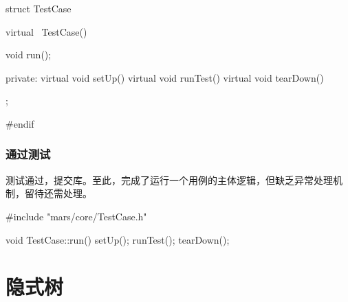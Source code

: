 \begin{content}
\begin{leftbar}
\begin{c++}[caption={\ttfamily{include/mars/core/TestCase.h}}]
struct TestCase {
  virtual ~TestCase() {}

  void run();

private:
  virtual void setUp() {}
  virtual void runTest() {}
  virtual void tearDown() {}
};

#endif
  \end{c++}
\end{leftbar}

\subsubsection{通过测试}

测试通过，提交库。至此，完成了运行一个用例的主体逻辑，但缺乏异常处理机制，留待还需处理。

\begin{leftbar}
 \begin{c++}[caption={\ttfamily{src/mars/core/TestCase.cc}}]
#include "mars/core/TestCase.h"

void TestCase::run() {
  setUp();
  runTest();
  tearDown();
}
 \end{c++}
\end{leftbar}



\end{content}

\section{隐式树}

